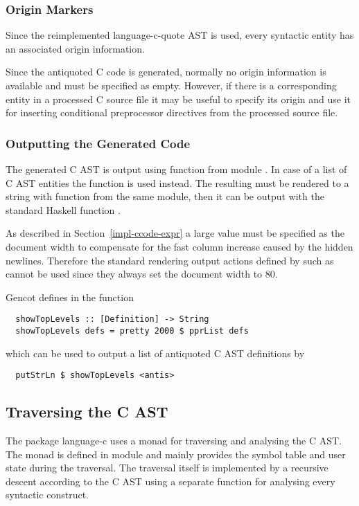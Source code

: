 \subsubsection{Origin Markers}

Since the reimplemented language-c-quote AST is used, every syntactic entity has an associated origin information.

Since the antiquoted C code is generated, normally no origin information is available and must be specified as
empty. However, if there is a corresponding entity in a processed C source file it may be useful to specify 
its origin and use it for inserting conditional preprocessor directives from the processed source file.

\subsubsection{Outputting the Generated Code}

The generated C AST is output using function  from module . In case of 
a list of C AST entities the function  is used instead. The resulting
 must be rendered to a string with function  from the same module, then it can be 
output with the standard Haskell function . 

As described in 
Section~\ref{impl-ccode-expr} a large value must be specified as the document width to compensate for the 
fast column increase caused by the hidden newlines. Therefore the standard rendering output actions defined
by  such as  cannot be used since they always set the document
width to 80.

Gencot defines in  the function
\begin{verbatim}
  showTopLevels :: [Definition] -> String
  showTopLevels defs = pretty 2000 $ pprList defs
\end{verbatim}
which can be used to output a list  of antiquoted C AST definitions by
\begin{verbatim}
  putStrLn $ showTopLevels <antis>
\end{verbatim}

\subsection{Traversing the C AST}
\label{impl-ccode-trav}

The package language-c uses a monad for traversing and analysing the C AST. The monad is defined in module 
 and mainly provides the symbol table and user state during the traversal.
The traversal itself is implemented by a recursive descent according to the C AST using a separate function
for analysing every syntactic construct. 

